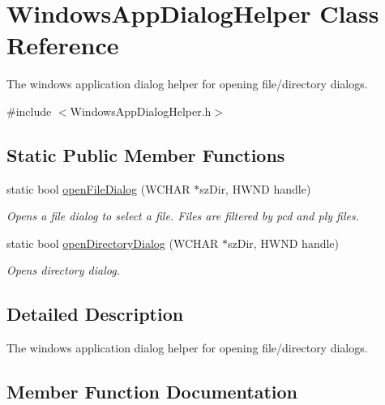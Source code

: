 \hypertarget{class_windows_app_dialog_helper}{}\section{Windows\+App\+Dialog\+Helper Class Reference}
\label{class_windows_app_dialog_helper}


The windows application dialog helper for opening file/directory dialogs.  




{\ttfamily \#include $<$Windows\+App\+Dialog\+Helper.\+h$>$}

\subsection*{Static Public Member Functions}
\begin{DoxyCompactItemize}
\item 
static bool \hyperlink{class_windows_app_dialog_helper_a35b2cee2fd16482aae5c2fbeca2abbcc}{open\+File\+Dialog} (W\+C\+H\+A\+R $\ast$sz\+Dir, H\+W\+N\+D handle)
\begin{DoxyCompactList}\small\item\em Opens a file dialog to select a file. Files are filtered by pcd and ply files. \end{DoxyCompactList}\item 
static bool \hyperlink{class_windows_app_dialog_helper_a15ebebdb4657a4846c69d175f647d2d2}{open\+Directory\+Dialog} (W\+C\+H\+A\+R $\ast$sz\+Dir, H\+W\+N\+D handle)
\begin{DoxyCompactList}\small\item\em Opens directory dialog. \end{DoxyCompactList}\end{DoxyCompactItemize}


\subsection{Detailed Description}
The windows application dialog helper for opening file/directory dialogs. 

\subsection{Member Function Documentation}
\hypertarget{class_windows_app_dialog_helper_a15ebebdb4657a4846c69d175f647d2d2}{}
